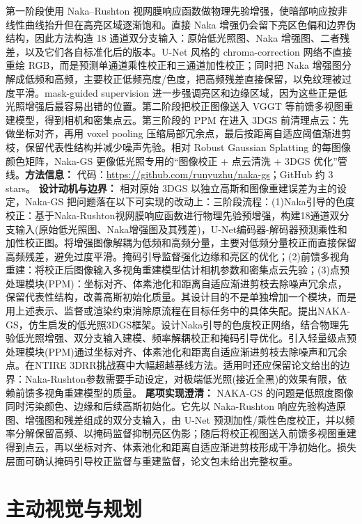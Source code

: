 第一阶段使用 Naka--Rushton 视网膜响应函数做物理先验增强，使暗部响应按非线性曲线抬升但在高亮区域逐渐饱和。直接 Naka 增强仍会留下亮区色偏和边界伪结构，因此方法构造 18 通道双分支输入：原始低光照图、Naka 增强图、二者残差，以及它们各自标准化后的版本。U-Net 风格的 chroma-correction 网络不直接重绘 RGB，而是预测单通道乘性校正和三通道加性校正；同时把 Naka 增强图分解成低频和高频，主要校正低频亮度/色度，把高频残差直接保留，以免纹理被过度平滑。mask-guided supervision 进一步强调亮区和边缘区域，因为这些正是低光照增强后最容易出错的位置。第二阶段把校正图像送入 VGGT 等前馈多视图重建模型，得到相机和密集点云。第三阶段的 PPM 在进入 3DGS 前清理点云：先做坐标对齐，再用 voxel pooling 压缩局部冗余点，最后按距离自适应阈值渐进剪枝，保留代表性结构并减少噪声先验。相对 Robust Gaussian Splatting 的每图像颜色矩阵，Naka-GS 更像低光照专用的“图像校正 + 点云清洗 + 3DGS 优化”管线。\textbf{方法信息：} 代码：\url{https://github.com/runyuzhu/naka-gs}；GitHub 约 3 stars。
\textbf{设计动机与边界：} 相对原始 3DGS 以独立高斯和图像重建误差为主的设定，Naka-GS 把问题落在以下可实现的改动上：三阶段流程：(1)Naka引导的色度校正：基于Naka-Rushton视网膜响应函数进行物理先验预增强，构建18通道双分支输入(原始低光照图、Naka增强图及其残差)，U-Net编码器-解码器预测乘性和加性校正图。将增强图像解耦为低频和高频分量，主要对低频分量校正而直接保留高频残差，避免过度平滑。掩码引导监督强化边缘和亮区的优化；(2)前馈多视角重建：将校正后图像输入多视角重建模型估计相机参数和密集点云先验；(3)点预处理模块(PPM)：坐标对齐、体素池化和距离自适应渐进剪枝去除噪声冗余点，保留代表性结构，改善高斯初始化质量。其设计目的不是单独增加一个模块，而是用上述表示、监督或渲染约束消除原流程在目标任务中的具体失配。提出NAKA-GS，仿生启发的低光照3DGS框架。设计Naka引导的色度校正网络，结合物理先验低光照增强、双分支输入建模、频率解耦校正和掩码引导优化。引入轻量级点预处理模块(PPM)通过坐标对齐、体素池化和距离自适应渐进剪枝去除噪声和冗余点。在NTIRE 3DRR挑战赛中大幅超越基线方法。适用时还应保留论文给出的边界：Naka-Rushton参数需要手动设定，对极端低光照(接近全黑)的效果有限，依赖前馈多视角重建模型的质量。
\textbf{尾项实现澄清：} NAKA-GS 的问题是低照度图像同时污染颜色、边缘和后续高斯初始化。它先以 Naka-Rushton 响应先验构造原图、增强图和残差组成的双分支输入，由 U-Net 预测加性/乘性色度校正，并以频率分解保留高频、以掩码监督抑制亮区伪影；随后将校正视图送入前馈多视图重建得到点云，再以坐标对齐、体素池化和距离自适应渐进剪枝形成干净初始化。损失层面可确认掩码引导校正监督与重建监督，论文包未给出完整权重。

\section{主动视觉与规划}

